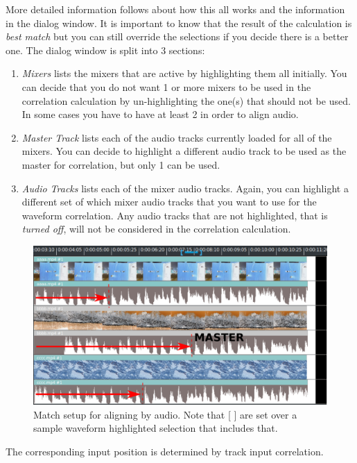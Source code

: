 More detailed information follows about how this all works and the information in the dialog window.  It is important to know that the result of the calculation is \textit{best match} but you can still override the selections if you decide there is a better one.  The dialog window is split into 3 sections:

\begin{enumerate}
    \item \textit{Mixers} lists the mixers that are active by highlighting them all initially. You can decide that you do
    not want 1 or more mixers to be used in the correlation calculation by un-highlighting the one(s) that should not be used. In some cases you have to have at least 2 in order to align audio.
    \item \textit{Master Track} lists each of the audio tracks currently loaded for all of the mixers. You can decide to highlight a different audio track to be used as the master for correlation, but only 1 can be used.
    \item \textit{Audio Tracks} lists each of the mixer audio tracks.  Again, you can highlight a different set of which
    mixer audio tracks that you want to use for the waveform correlation.  Any audio tracks that are not
    highlighted, that is \textit{turned off}, will not be considered in the correlation calculation.
\end{enumerate}

\begin{figure}[htpb]
    \centering
    \includegraphics[width=0.9\linewidth]{images/mixer-align03.png}
    \caption{Match setup for aligning by audio.  Note that [ ] are set over a sample waveform highlighted selection that includes that.}
    \label{fig:mixer-align03}
\end{figure}

The corresponding input position is determined by track input correlation.

